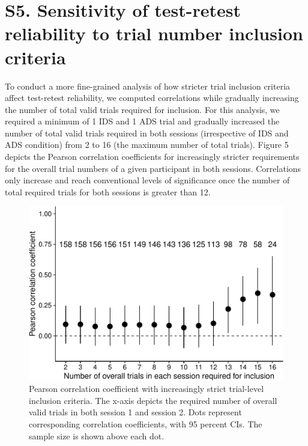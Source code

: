 \documentclass[
  man, donotrepeattitle,floatsintext]{apa6}
\begin{document}
\newpage

\hypertarget{s5.-sensitivity-of-test-retest-reliability-to-trial-number-inclusion-criteria}{%
\section{S5. Sensitivity of test-retest reliability to trial number inclusion criteria}\label{s5.-sensitivity-of-test-retest-reliability-to-trial-number-inclusion-criteria}}

To conduct a more fine-grained analysis of how stricter trial inclusion criteria affect test-retest reliability, we computed correlations while gradually increasing the number of total valid trials required for inclusion.
For this analysis, we required a minimum of 1 IDS and 1 ADS trial and gradually increased the number of total valid trials required in both sessions (irrespective of IDS and ADS condition) from 2 to 16 (the maximum number of total trials).
Figure 5 depicts the Pearson correlation coefficients for increasingly stricter requirements for the overall trial numbers of a given participant in both sessions.
Correlations only increase and reach conventional levels of significance once the number of total required trials for both sessions is greater than 12.

\begin{figure}
\centering
\includegraphics{MB1T_supplement_files/figure-latex/sfig5-1.pdf}
\caption{\label{fig:sfig5}Pearson correlation coefficient with increasingly strict trial-level inclusion criteria. The x-axis depicts the required number of overall valid trials in both session 1 and session 2. Dots represent corresponding correlation coefficients, with 95 percent CIs. The sample size is shown above each dot.}
\end{figure}
\end{document}
